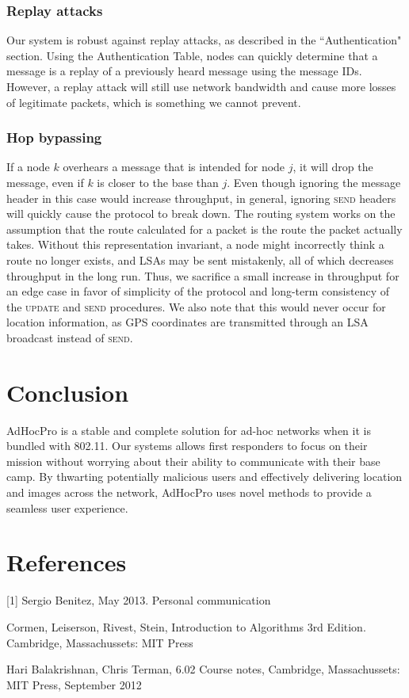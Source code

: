 \documentclass[letterpaper]{article}
\begin{document}
\subsubsection{Replay attacks}

Our system is robust against replay attacks, as described in the ``Authentication" section. Using the Authentication Table, 
nodes can quickly determine that a message is a replay of a previously heard message using the message IDs. However, 
a replay attack will still use network bandwidth and cause more losses of legitimate packets, which is something we cannot prevent.

\subsubsection{Hop bypassing}

If a node $k$ overhears a message that is intended for node $j$, it will drop the message, even if $k$ is closer to the base than $j$.
Even though ignoring the message header in this case would increase throughput, in general, ignoring \textsc{send} headers will quickly cause
the protocol to break down. The routing system works on the assumption that the route calculated for a packet is the route the packet
actually takes. Without this representation invariant, a node might incorrectly think a route no longer exists, and LSAs may be sent 
mistakenly, all of which decreases throughput in the long run. Thus, we sacrifice a small increase in throughput for an edge case in
favor of simplicity of the protocol and long-term consistency of the \textsc{update} and \textsc{send} procedures. We also note that 
this would never occur for location information, as GPS coordinates are transmitted through an LSA broadcast instead of \textsc{send}. 

\section{Conclusion}

AdHocPro is a stable and complete solution for ad-hoc networks when it is bundled with 802.11. Our systems allows first responders to
focus on their mission without worrying about their ability to communicate with their base camp. By thwarting potentially malicious
users and effectively delivering location and images across the network, AdHocPro uses novel methods to provide a seamless user experience.

\section{References}

[1] Sergio Benitez, May 2013. Personal communication

\noindent[2] Cormen, Leiserson, Rivest, Stein, Introduction to Algorithms 3rd Edition. Cambridge, Massachussets: MIT Press

\noindent[3] Hari Balakrishnan, Chris Terman, 6.02 Course notes, Cambridge, Massachussets: MIT Press, September 2012
\end{document}
